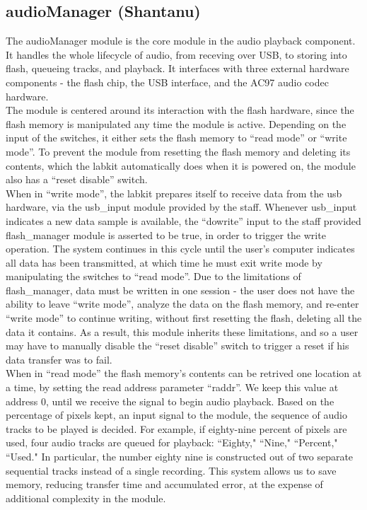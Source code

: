 \documentclass{article}
\begin{document}
\subsection{audioManager (Shantanu)}
The audioManager module is the core module in the audio playback component. It handles the whole lifecycle of audio, from receving over USB, to storing into flash, queueing tracks, and playback. It interfaces with three external hardware components - the flash chip, the USB interface, and the AC97 audio codec hardware.\\
The module is centered around its interaction with the flash hardware, since the flash memory is manipulated any time the module is active. Depending on the input of the switches, it either sets the flash memory to ``read mode''  or ``write mode''. To prevent the module from resetting the flash memory and deleting its contents, which the labkit automatically does when it is powered on, the module also has a ``reset disable'' switch.\\
When in ``write mode'', the labkit prepares itself to receive data from the usb hardware, via the usb\_input module provided by the staff. Whenever usb\_input indicates a new data sample is available, the ``dowrite'' input to the staff provided flash\_manager module is asserted to be true, in order to trigger the write operation. The system continues in this cycle until the user's computer indicates all data has been transmitted, at which time he must exit write mode by manipulating the switches to ``read mode''. Due to the limitations of flash\_manager, data must be written in one session - the user does not have the ability to leave ``write mode'', analyze the data on the flash memory, and re-enter ``write mode'' to continue writing, without first resetting the flash, deleting all the data it contains. As a result, this module inherits these limitations, and so a user may have to manually disable the ``reset disable'' switch to trigger a reset if his data transfer was to fail. \\
When in ``read mode'' the flash memory's contents can be retrived one location at a time, by setting the read address parameter ``raddr''. We keep this value at address 0, until we receive the signal to begin audio playback. Based on the percentage of pixels kept, an input signal to the module, the sequence of audio tracks to be played is decided. For example, if eighty-nine percent of pixels are used, four audio tracks are queued for playback: ``Eighty," ``Nine," ``Percent," ``Used." In particular, the number eighty nine is constructed out of two separate sequential tracks instead of a single recording. This system allows us to save memory, reducing transfer time and accumulated error, at the expense of additional complexity in the module.\\
\end{document}
